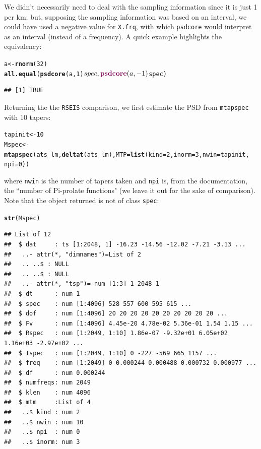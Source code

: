 \documentclass{article}\usepackage{graphicx, color}
\makeatletter
\newcommand{\hlfunctioncall}[1]{\textcolor[rgb]{0.501960784313725,0,0.329411764705882}{\textbf{#1}}}%
\newenvironment{kframe}{%
 \def\at@end@of@kframe{}%
 \ifinner\ifhmode%
  \def\at@end@of@kframe{\end{minipage}}%
  \begin{minipage}{\columnwidth}%
 \fi\fi%
 \def\FrameCommand##1{\hskip\@totalleftmargin \hskip-\fboxsep
 \colorbox{shadecolor}{##1}\hskip-\fboxsep
     \hskip-\linewidth \hskip-\@totalleftmargin \hskip\columnwidth}%
 \MakeFramed {\advance\hsize-\width
   \@totalleftmargin\z@ \linewidth\hsize
   \@setminipage}}%
 {\par\unskip\endMakeFramed%
 \at@end@of@kframe}
\newenvironment{knitrout}{}{} %
\newcommand{\Rcmd}[1]{\texttt{#1}}
\makeatother
\begin{document}
We didn't necessarily need to deal with the sampling information since it is just 1 per km;
but, supposing the sampling information was based on an interval, we
could have used
a negative value for \Rcmd{X.frq}, 
with which \Rcmd{psdcore}
would interpret as
an interval (instead of a frequency). 
A quick example highlights the equivalency:
\begin{knitrout}
\color{fgcolor}\begin{kframe}
\begin{alltt}
a <- \hlfunctioncall{rnorm}(32)
\hlfunctioncall{all.equal}(\hlfunctioncall{psdcore}(a, 1)$spec, \hlfunctioncall{psdcore}(a, -1)$spec)
\end{alltt}
\begin{verbatim}
## [1] TRUE
\end{verbatim}
\end{kframe}
\end{knitrout}


Returning the the \Rcmd{RSEIS} comparison, we first 
estimate the PSD from \Rcmd{mtapspec} with 10 tapers:
\begin{knitrout}
\color{fgcolor}\begin{kframe}
\begin{alltt}
tapinit <- 10
Mspec <- \hlfunctioncall{mtapspec}(ats_lm, \hlfunctioncall{deltat}(ats_lm), MTP = \hlfunctioncall{list}(kind = 2, inorm = 3, nwin = tapinit, 
    npi = 0))
\end{alltt}
\end{kframe}
\end{knitrout}

where \Rcmd{nwin} is the number of tapers taken and
\Rcmd{npi} is, from the documentation, the ``number of Pi-prolate functions" (we
leave it out for the sake of comparison). 
Note that the object returned
is not of class \Rcmd{spec}:
\begin{knitrout}
\color{fgcolor}\begin{kframe}
\begin{alltt}
\hlfunctioncall{str}(Mspec)
\end{alltt}
\begin{verbatim}
## List of 12
##  $ dat     : ts [1:2048, 1] -16.23 -14.56 -12.02 -7.21 -3.13 ...
##   ..- attr(*, "dimnames")=List of 2
##   .. ..$ : NULL
##   .. ..$ : NULL
##   ..- attr(*, "tsp")= num [1:3] 1 2048 1
##  $ dt      : num 1
##  $ spec    : num [1:4096] 528 557 600 595 615 ...
##  $ dof     : num [1:4096] 20 20 20 20 20 20 20 20 20 20 ...
##  $ Fv      : num [1:4096] 4.45e-20 4.78e-02 5.36e-01 1.54 1.15 ...
##  $ Rspec   : num [1:2049, 1:10] 1.86e-07 -9.32e+01 6.05e+02 1.16e+03 -2.97e+02 ...
##  $ Ispec   : num [1:2049, 1:10] 0 -227 -569 665 1157 ...
##  $ freq    : num [1:2049] 0 0.000244 0.000488 0.000732 0.000977 ...
##  $ df      : num 0.000244
##  $ numfreqs: num 2049
##  $ klen    : num 4096
##  $ mtm     :List of 4
##   ..$ kind : num 2
##   ..$ nwin : num 10
##   ..$ npi  : num 0
##   ..$ inorm: num 3
\end{verbatim}
\end{kframe}
\end{knitrout}
\end{document}

